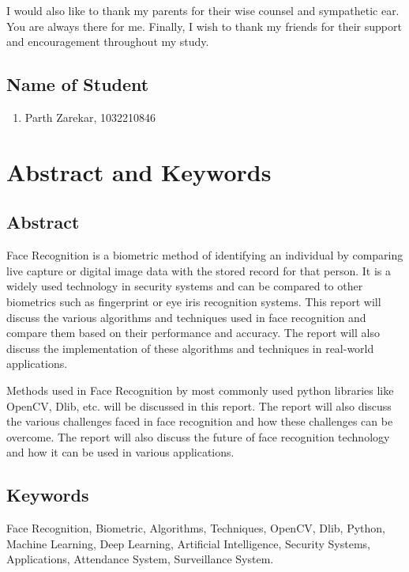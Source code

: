 \documentclass[openany]{report}
\begin{document}
I would also like to thank my parents for their wise counsel and sympathetic ear. You are always there for me. Finally, I wish to thank my friends for their support and encouragement throughout my study.



\section*{Name of Student}
\begin{enumerate}
    \item Parth Zarekar, 1032210846
\end{enumerate}

\thispagestyle{empty}
\clearpage


\tableofcontents
\thispagestyle{empty}
\clearpage

\chapter*{Abstract and Keywords}

\section{Abstract}
Face Recognition is a biometric method of identifying an individual by comparing live capture or digital image data with the stored record for that person. It is a widely used technology in security systems and can be compared to other biometrics such as fingerprint or eye iris recognition systems. This report will discuss the various algorithms and techniques used in face recognition and compare them based on their performance and accuracy. The report will also discuss the implementation of these algorithms and techniques in real-world applications.

Methods used in Face Recognition by most commonly used python libraries like OpenCV, Dlib, etc. will be discussed in this report. The report will also discuss the various challenges faced in face recognition and how these challenges can be overcome. The report will also discuss the future of face recognition technology and how it can be used in various applications.
\section{Keywords}
Face Recognition, Biometric, Algorithms, Techniques, OpenCV, Dlib, Python, Machine Learning, Deep Learning, Artificial Intelligence, Security Systems, Applications, Attendance System, Surveillance System.
\end{document}
